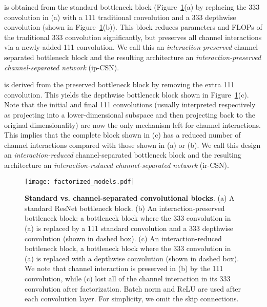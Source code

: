 \documentclass[10pt,twocolumn,letterpaper]{article}
\newcommand{\ddd}[1]{#1#1#1}
\begin{document}
 is obtained from the standard bottleneck block (Figure~\ref{fig:factorized_blocks}(a) by replacing the \ddd{3} convolution in (a) with a \ddd{1} traditional convolution and a \ddd{3} depthwise convolution (shown in Figure~\ref{fig:factorized_blocks}(b)). This block reduces parameters and FLOPs of the traditional \ddd{3} convolution significantly, but preserves all channel interactions via a newly-added \ddd{1} convolution. We call this an {\it interaction-preserved} channel-separated bottleneck block and the resulting architecture an {\it interaction-preserved channel-separated network} (ip-CSN).

 is derived from the preserved bottleneck block by removing the extra \ddd{1} convolution.  This yields the depthwise bottleneck block shown in Figure~\ref{fig:factorized_blocks}(c). Note that the initial and final \ddd{1} convolutions (usually interpreted respectively as projecting into a lower-dimensional subspace and then projecting back to the original dimensionality) are now the only mechanism left for channel interactions.  This implies that the complete block shown in (c) has a reduced number of channel interactions compared with those shown in (a) or (b). We call this design an {\it interaction-reduced} channel-separated bottleneck block and the resulting architecture an {\it interaction-reduced channel-separated network} (ir-CSN).


\begin{figure}
\begin{center}
   \texttt{[image: factorized\_models.pdf]}
\end{center}
\vspace{-10pt}
   \caption{{\bf Standard vs. channel-separated convolutional blocks}. (a) A standard ResNet bottleneck block. (b) An interaction-preserved bottleneck block: a bottleneck block where the \ddd{3} convolution in (a) is replaced by a \ddd{1} standard convolution and a \ddd{3} depthwise convolution (shown in dashed box). (c) An interaction-reduced bottleneck block, a bottleneck block where the \ddd{3} convolution in (a) is replaced with a depthwise convolution (shown in dashed box). We note that channel interaction is preserved in (b) by the \ddd{1} convolution, while (c) lost all of the channel interaction in its \ddd{3} convolution after factorization. Batch norm and ReLU are used after each convolution layer. For simplicity, we omit the skip connections.}
\label{fig:factorized_blocks}
\end{figure}
\end{document}
